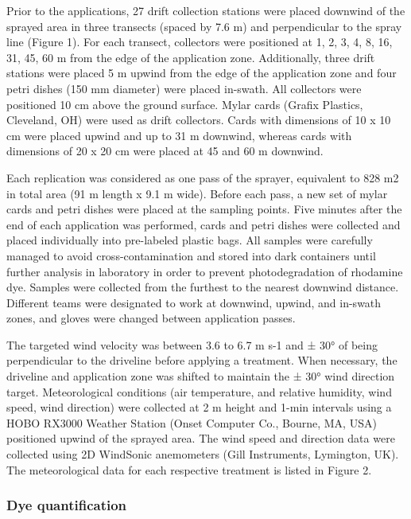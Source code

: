 \documentclass[
  12pt,
  a4paper,
]{article}
\begin{document}
Prior to the applications, 27 drift collection stations were placed
downwind of the sprayed area in three transects (spaced by 7.6 m) and
perpendicular to the spray line (Figure 1). For each transect,
collectors were positioned at 1, 2, 3, 4, 8, 16, 31, 45, 60 m from the
edge of the application zone. Additionally, three drift stations were
placed 5 m upwind from the edge of the application zone and four petri
dishes (150 mm diameter) were placed in-swath. All collectors were
positioned 10 cm above the ground surface. Mylar cards (Grafix Plastics,
Cleveland, OH) were used as drift collectors. Cards with dimensions of
10 x 10 cm were placed upwind and up to 31 m downwind, whereas cards
with dimensions of 20 x 20 cm were placed at 45 and 60 m downwind.

Each replication was considered as one pass of the sprayer, equivalent
to 828 m2 in total area (91 m length x 9.1 m wide). Before each pass, a
new set of mylar cards and petri dishes were placed at the sampling
points. Five minutes after the end of each application was performed,
cards and petri dishes were collected and placed individually into
pre-labeled plastic bags. All samples were carefully managed to avoid
cross-contamination and stored into dark containers until further
analysis in laboratory in order to prevent photodegradation of rhodamine
dye. Samples were collected from the furthest to the nearest downwind
distance. Different teams were designated to work at downwind, upwind,
and in-swath zones, and gloves were changed between application passes.

The targeted wind velocity was between 3.6 to 6.7 m s-1 and ± 30° of
being perpendicular to the driveline before applying a treatment. When
necessary, the driveline and application zone was shifted to maintain
the ± 30° wind direction target. Meteorological conditions (air
temperature, and relative humidity, wind speed, wind direction) were
collected at 2 m height and 1-min intervals using a HOBO RX3000 Weather
Station (Onset Computer Co., Bourne, MA, USA) positioned upwind of the
sprayed area. The wind speed and direction data were collected using 2D
WindSonic anemometers (Gill Instruments, Lymington, UK). The
meteorological data for each respective treatment is listed in Figure 2.

\hypertarget{dye-quantification}{%
\subsubsection{Dye quantification}\label{dye-quantification}}
\end{document}
